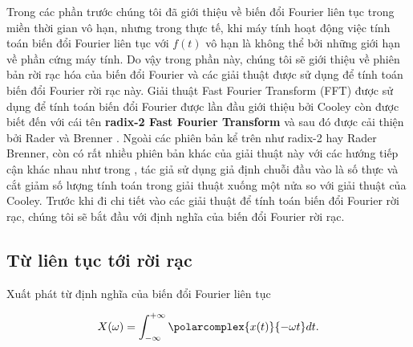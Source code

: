 		Trong các phần trước chúng tôi đã giới thiệu về biến đổi Fourier liên tục trong miền thời gian vô hạn, nhưng trong thực tế, khi máy tính hoạt động việc tính toán biến đổi Fourier liên tục với $f(t)$ vô hạn là không thể bởi những giới hạn về phần cứng máy tính. Do vậy trong phần này, chúng tôi sẽ giới thiệu về phiên bản rời rạc hóa của biến đổi Fourier và các giải thuật được sử dụng để tính toán biến đổi Fourier rời rạc này. Giải thuật Fast Fourier Transform (FFT) được sử dụng để tính toán biến đổi Fourier được lần đầu giới thiệu bởi Cooley \cite{fft_cooley} còn được biết đến với cái tên \textbf{radix-2 Fast Fourier Transform} và sau đó được cải thiện bởi Rader và Brenner \cite{fft_rader_brenner, fft_springer_nuss}. Ngoài các phiên bản kể trên như radix-2 hay Rader Brenner, còn có rất nhiều phiên bản khác của giải thuật này với các hướng tiếp cận khác nhau như trong \cite{fft_bergland}, tác giả sử dụng giả định chuỗi đầu vào là số thực và cắt giảm số lượng tính toán trong giải thuật xuống một nửa so với giải thuật của Cooley. Trước khi đi chi tiết vào các giải thuật để tính toán biến đổi Fourier rời rạc, chúng tôi sẽ bắt đầu với định nghĩa của biến đổi Fourier rời rạc.
	
		\subsection{Từ liên tục tới rời rạc}\label{subsection::signal_processing::dft::def}
		
			Xuất phát từ định nghĩa của biến đổi Fourier liên tục
			
				\begin{equation*}
					X(\omega) = \int_{-\infty}^{+\infty} \polarcomplex{x(t)}{-\omega t} dt.
				\end{equation*}
			
			
			
				
